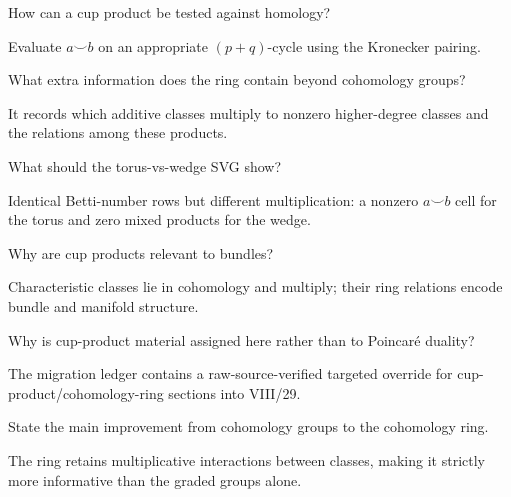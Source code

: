 \begin{problem}[Pairing]\label{prob:viii29-17}
How can a cup product be tested against homology?
\end{problem}
\begin{solution}
Evaluate \(a\smile b\) on an appropriate \((p+q)\)-cycle using the Kronecker pairing.
\end{solution}

\begin{problem}\label{prob:viii29-18}
What extra information does the ring contain beyond cohomology groups?
\end{problem}
\begin{solution}
It records which additive classes multiply to nonzero higher-degree classes and the relations among these products.
\end{solution}

\begin{problem}\label{prob:viii29-19}
What should the torus-vs-wedge SVG show?
\end{problem}
\begin{solution}
Identical Betti-number rows but different multiplication: a nonzero \(a\smile b\) cell for the torus and zero mixed products for the wedge.
\end{solution}

\begin{problem}[Bridge]\label{prob:viii29-20}
Why are cup products relevant to bundles?
\end{problem}
\begin{solution}
Characteristic classes lie in cohomology and multiply; their ring relations encode bundle and manifold structure.
\end{solution}

\begin{problem}\label{prob:viii29-21}
Why is cup-product material assigned here rather than to Poincaré duality?
\end{problem}
\begin{solution}
The migration ledger contains a raw-source-verified targeted override for cup-product/cohomology-ring sections into VIII/29.
\end{solution}

\begin{problem}\label{prob:viii29-22}
State the main improvement from cohomology groups to the cohomology ring.
\end{problem}
\begin{solution}
The ring retains multiplicative interactions between classes, making it strictly more informative than the graded groups alone.
\end{solution}
